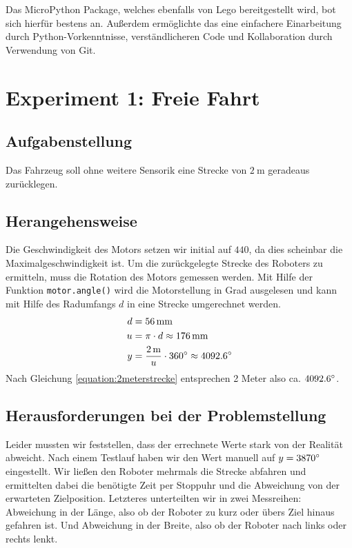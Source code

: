 \documentclass[ngerman]{tudscrreprt}
\newcommand{\code}[1]{\texttt{#1}}
\begin{document}
Das MicroPython Package, welches ebenfalls von Lego bereitgestellt wird, bot sich hierfür bestens an. Außerdem ermöglichte das eine einfachere Einarbeitung durch Python-Vorkenntnisse, verständlicheren Code und Kollaboration durch Verwendung von Git.


\section{Experiment 1: Freie Fahrt}
\subsection{Aufgabenstellung}
Das Fahrzeug soll ohne weitere Sensorik eine Strecke von $\SI{2}{\m}$ geradeaus zurücklegen.

\subsection{Herangehensweise}
Die Geschwindigkeit des Motors setzen wir initial auf $440$, da dies scheinbar die Maximalgeschwindigkeit ist. Um die zurückgelegte Strecke des Roboters zu ermitteln, muss die Rotation des Motors gemessen werden. Mit Hilfe der Funktion \code{motor.angle()} wird die Motorstellung in Grad ausgelesen und kann mit Hilfe des Radumfangs $d$ in eine Strecke umgerechnet werden.
%
\begin{equation}
    \label{equation:2meterstrecke}
    \begin{aligned}
       d &= \SI{56}{\mm}\\
       u &= \pi \cdot d \approx \SI{176}{\mm} \\
       y &= \frac{\SI{2}{\m}}{u} \cdot 360\degree \approx 4092.6\degree
    \end{aligned}
 \end{equation}
Nach Gleichung \ref{equation:2meterstrecke} entsprechen 2 Meter also ca. $4092.6\degree$.

\subsection{Herausforderungen bei der Problemstellung}
Leider mussten wir feststellen, dass der errechnete Werte stark von der Realität abweicht. Nach einem Testlauf haben wir den Wert manuell auf $y = 3870\degree$ eingestellt. Wir ließen den Roboter mehrmals die Strecke abfahren und ermittelten dabei die benötigte Zeit per Stoppuhr und die Abweichung von der erwarteten Zielposition. Letzteres unterteilten wir in zwei Messreihen: Abweichung in der Länge, also ob der Roboter zu kurz oder übers Ziel hinaus gefahren ist. Und Abweichung in der Breite, also ob der Roboter nach links oder rechts lenkt.
\end{document}
